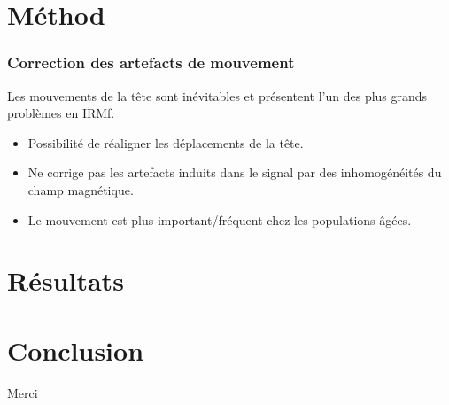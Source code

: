 \documentclass{beamer}
\begin{document}
\section{Méthod}



\begin{frame}
\frametitle{Correction des artefacts de mouvement}
Les mouvements de la tête sont inévitables et présentent l’un des plus grands problèmes en IRMf.
\hfill\break
\begin{itemize}
\item Possibilité de réaligner les déplacements de la tête.
\item Ne corrige pas les artefacts induits dans le signal par des inhomogénéités du champ magnétique.
\item Le mouvement est plus important/fréquent chez les populations âgées. 
\end{itemize}
\end{frame}

\section{Résultats}

\section{Conclusion}


\begin{frame}
\Huge{\centerline{Merci}}
\end{frame}

\end{document}
